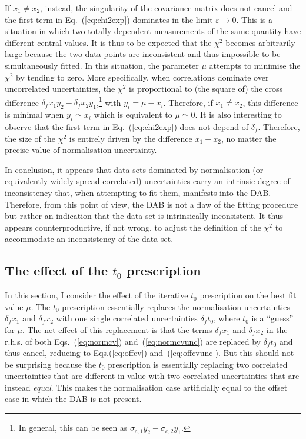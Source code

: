 \documentclass[10pt,a4paper]{article}
\begin{document}
If $x_1\neq x_2$, instead, the singularity of the covariance matrix
does not cancel and the first term in Eq.~(\ref{eq:chi2exp}) dominates
in the limit $\varepsilon\rightarrow0$. This is a situation in which
two totally dependent measurements of the same quantity have different
central values. It is thus to be expected that the $\chi^2$ becomes
arbitrarily large because the two data points are inconsistent and
thus impossible to be simultaneously fitted. In this situation, the
parameter $\mu$ attempts to minimise the $\chi^2$ by tending to
zero. More specifically, when correlations dominate over uncorrelated
uncertainties, the $\chi^2$ is proportional to (the square of) the
cross difference $\delta_fx_1y_2-\delta_fx_2y_1$,\footnote{In general,
  this can be seen as $\sigma_{c,1}y_2-\sigma_{c,2}y_1$.}  with
$y_i = \mu - x_i$. Therefore, if $x_1\neq x_2$, this difference is
minimal when $y_i\simeq x_i$ which is equivalent to $\mu\simeq 0$. It
is also interesting to observe that the first term in
Eq.~(\ref{eq:chi2exp}) does not depend of $\delta_f$. Therefore, the
size of the $\chi^2$ is entirely driven by the difference $x_1-x_2$,
no matter the precise value of normalisation uncertainty.

In conclusion, it appears that data sets dominated by normalisation
(or equivalently widely spread correlated) uncertainties carry an
intrinsic degree of inconsistency that, when attempting to fit them,
manifests into the DAB. Therefore, from this point of view, the DAB is
not a flaw of the fitting procedure but rather an indication that the
data set is intrinsically inconsistent. It thus appears
counterproductive, if not wrong, to adjust the definition of the
$\chi^2$ to accommodate an inconsistency of the data set.

\subsection{The effect of the $t_0$ prescription}

In this section, I consider the effect of the iterative $t_0$
prescription on the best fit value $\overline{\mu}$. The $t_0$
prescription essentially replaces the normalisation uncertainties
$\delta_fx_1$ and $\delta_fx_2$ with one single correlated
uncertainties $\delta_f t_0$, where $t_0$ is a ``guess'' for
$\mu$. The net effect of this replacement is that the terms
$\delta_fx_1$ and $\delta_fx_2$ in the r.h.s. of both
Eqs.~(\ref{eq:normcv}) and~(\ref{eq:normcvunc}) are replaced by
$\delta_ft_0$ and thus cancel, reducing to Eqs.(\ref{eq:offcv})
and~(\ref{eq:offcvunc}). But this should not be surprising because the
$t_0$ prescription is essentially replacing two correlated
uncertainties that are different in value with two correlated
uncertainties that are instead \textit{equal}. This makes the
normalisation case artificially equal to the offset case in which the
DAB is not present.
\end{document}
